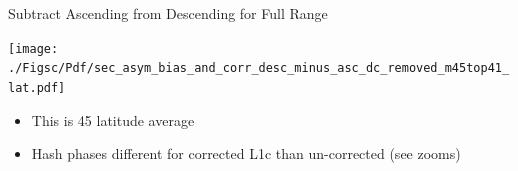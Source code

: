 \documentclass[10pt,t]{beamer}
\begin{document}
\begin{frame}[label={sec:org5c19f92}]{Subtract Ascending from Descending for Full Range}
\vspace{-0.1in}
\begin{center}
\texttt{[image: ./Figsc/Pdf/sec\_asym\_bias\_and\_corr\_desc\_minus\_asc\_dc\_removed\_m45top41\_lat.pdf]}
\end{center}

\vspace{-0.15in}

\begin{itemize}
\item \small This is \textpm{}45\textdegree{} latitude average
\item \small Hash phases different for corrected L1c than un-corrected (see zooms)
\end{itemize}
\end{frame}
\end{document}

